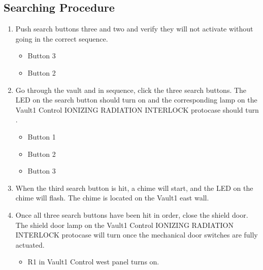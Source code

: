 \documentclass[letterpaper,10pt,english]{sphinxmanual}
\begin{document}
\subsection{Searching Procedure}
\label{\detokenize{testing_documentation/Vault-1_ionizing_radiation:searching-procedure}}\begin{enumerate}
%
\item {} 
\sphinxAtStartPar
Push search buttons three and two and verify they will not activate without going in the correct sequence.
\begin{itemize}
\item {} 
\sphinxAtStartPar
Button 3

\item {} 
\sphinxAtStartPar
Button 2

\end{itemize}

\item {} 
\sphinxAtStartPar
Go through the vault and in sequence, click the three search buttons.
The LED on the search button should turn on and the corresponding lamp on the Vault\sphinxhyphen{}1 Control IONIZING RADIATION INTERLOCK protocase should turn .
\begin{itemize}
\item {} 
\sphinxAtStartPar
Button 1

\item {} 
\sphinxAtStartPar
Button 2

\item {} 
\sphinxAtStartPar
Button 3

\end{itemize}

\item {} 
\sphinxAtStartPar
When the third search button is hit, a chime will start, and the LED on the chime will flash.
The chime is located on the Vault\sphinxhyphen{}1 east wall.

\item {} 
\sphinxAtStartPar
Once all three search buttons have been hit in order, close the shield door.
The shield door lamp on the Vault\sphinxhyphen{}1 Control IONIZING RADIATION INTERLOCK protocase will turn  once the mechanical door switches are fully actuated.
\begin{itemize}
\item {} 
\sphinxAtStartPar
R1 in Vault\sphinxhyphen{}1 Control west panel turns on.

\end{itemize}

\end{enumerate}
\end{document}
